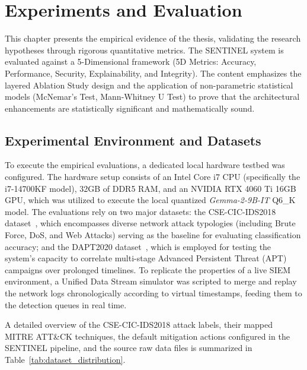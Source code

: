 \chapter{Experiments and Evaluation}
\label{ch:experiments_evaluation}

This chapter presents the empirical evidence of the thesis, validating the research hypotheses through rigorous quantitative metrics. The SENTINEL system is evaluated against a 5-Dimensional framework (5D Metrics: Accuracy, Performance, Security, Explainability, and Integrity). The content emphasizes the layered Ablation Study design and the application of non-parametric statistical models (McNemar's Test, Mann-Whitney U Test) to prove that the architectural enhancements are statistically significant and mathematically sound.

\section{Experimental Environment and Datasets}
To execute the empirical evaluations, a dedicated local hardware testbed was configured. The hardware setup consists of an Intel Core i7 CPU (specifically the i7-14700KF model), 32GB of DDR5 RAM, and an NVIDIA RTX 4060 Ti 16GB GPU, which was utilized to execute the local quantized \textit{Gemma-2-9B-IT} Q6\_K model. The evaluations rely on two major datasets: the CSE-CIC-IDS2018 dataset~\cite{ids2018}, which encompasses diverse network attack typologies (including Brute Force, DoS, and Web Attacks) serving as the baseline for evaluating classification accuracy; and the DAPT2020 dataset~\cite{dapt2020}, which is employed for testing the system's capacity to correlate multi-stage Advanced Persistent Threat (APT) campaigns over prolonged timelines. To replicate the properties of a live SIEM environment, a Unified Data Stream simulator was scripted to merge and replay the network logs chronologically according to virtual timestamps, feeding them to the detection queues in real time.

A detailed overview of the CSE-CIC-IDS2018 attack labels, their mapped MITRE ATT\&CK techniques, the default mitigation actions configured in the SENTINEL pipeline, and the source raw data files is summarized in Table~\ref{tab:dataset_distribution}.


